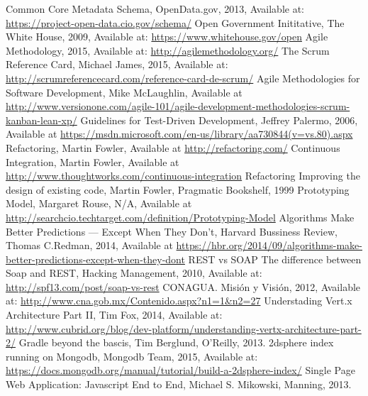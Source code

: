\begin{thebibliography}{1}
    Common Core Metadata Schema, OpenData.gov, 2013, Available at: \url{https://project-open-data.cio.gov/schema/}
    Open Government Inititative, The White House, 2009, Available at: \url{https://www.whitehouse.gov/open}
    Agile Methodology, 2015, Available at: \url{http://agilemethodology.org/}
    The Scrum Reference Card, Michael James, 2015, Available at: \url{http://scrumreferencecard.com/reference-card-de-scrum/}
    Agile Methodologies for Software Development, Mike McLaughlin, Available at \url{http://www.versionone.com/agile-101/agile-development-methodologies-scrum-kanban-lean-xp/}
    Guidelines for Test-Driven Development, Jeffrey Palermo, 2006, Available at \url{https://msdn.microsoft.com/en-us/library/aa730844(v=vs.80).aspx}
    Refactoring, Martin Fowler, Available at \url{http://refactoring.com/}
    Continuous Integration, Martin Fowler, Available at \url{http://www.thoughtworks.com/continuous-integration}
     Refactoring \: Improving the design of existing code, Martin Fowler, Pragmatic Bookshelf, 1999
     Prototyping Model, Margaret Rouse, N/A, Available at \url{http://searchcio.techtarget.com/definition/Prototyping-Model}
    Algorithms Make Better Predictions — Except When They Don’t, Harvard Bussiness Review, Thomas C.Redman, 2014, Available at \url{https://hbr.org/2014/09/algorithms-make-better-predictions-except-when-they-dont}
    REST vs SOAP\: The difference between Soap and REST, Hacking Management, 2010, Available at: \url{http://spf13.com/post/soap-vs-rest}
    CONAGUA. Misión y Visión, 2012, Available at: \url{http://www.cna.gob.mx/Contenido.aspx?n1=1&n2=27}
    Understading Vert.x Architecture Part II, Tim Fox, 2014, Available at: \url{http://www.cubrid.org/blog/dev-platform/understanding-vertx-architecture-part-2/}
    Gradle beyond the bascis, Tim Berglund, O'Reilly, 2013.
    2dsphere index running on Mongodb, Mongodb Team, 2015, Available at: \url{https://docs.mongodb.org/manual/tutorial/build-a-2dsphere-index/}
    Single Page Web Application: Javascript End to End, Michael S. Mikowski, Manning, 2013.
\end{thebibliography}

